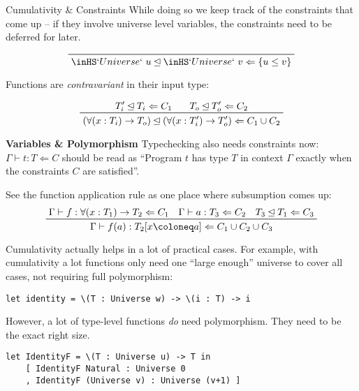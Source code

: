 \documentclass[12pt]{article}
\newcommand{\subsumedBy}{\unlhd}
\begin{document}
\begin{posterbard}
\begin{posterbox}{Cumulativity \& Constraints}
While doing so we keep track of the constraints that come up -- if they involve universe level variables, the constraints need to be deferred for later.

\begin{displaymath}
\prftree{\inHS`Universe`\ u \subsumedBy \inHS`Universe`\ v \Leftarrow \{u \le v\}}
\end{displaymath}
\vspace{0.05em}

Functions are \emph{contravariant} in their input type:

\begin{displaymath}
\prftree{T^\prime_i \subsumedBy T_i \Leftarrow C_1\quad}{T_o \subsumedBy T^\prime_o \Leftarrow C_2}{(\forall(x : T_i) \to T_o) \subsumedBy (\forall(x : T^\prime_i) \to T^\prime_o) \Leftarrow C_1 \cup C_2}
\end{displaymath}
\end{posterbox}

\begin{posterbox}{\textbf{Variables \& Polymorphism}}
Typechecking also needs constraints now: \(\Gamma \vdash t : T \Leftarrow C\) should be read as ``Program \(t\) has type \(T\) in context \(\Gamma\) exactly when the constraints \(C\) are satisfied''.

See the function application rule as one place where subsumption comes up:
\begin{displaymath}
\prftree{\Gamma \vdash f : \forall(x : T_1) \to T_2 \Leftarrow C_1\,}{\Gamma \vdash a : T_3 \Leftarrow C_2\,}{T_3 \subsumedBy T_1 \Leftarrow C_3}{\Gamma \vdash f(a) : T_2[x \coloneq a] \Leftarrow C_1 \cup C_2 \cup C_3}
\end{displaymath}

Cumulativity actually helps in a lot of practical cases.
For example, with cumulativity a lot functions only need one ``large enough'' universe to cover all cases, not requiring full polymorphism:
\begin{verbatim}
let identity = \(T : Universe w) -> \(i : T) -> i
\end{verbatim}

However, a lot of type-level functions \emph{do} need polymorphism.
They need to be the exact right size.

\begin{verbatim}
let IdentityF = \(T : Universe u) -> T in
    [ IdentityF Natural : Universe 0
    , IdentityF (Universe v) : Universe (v+1) ]
\end{verbatim}


\end{posterbox}
\end{posterbard}
\end{document}
